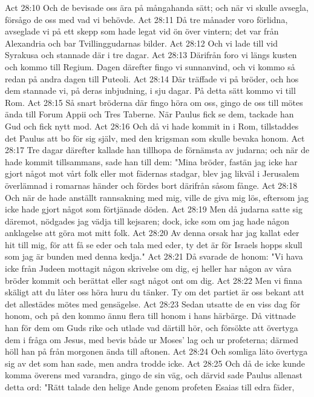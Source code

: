 Act 28:10  Och de bevisade oss ära på mångahanda sätt; och när vi skulle avsegla, försågo de oss med vad vi behövde.
Act 28:11  Då tre månader voro förlidna, avseglade vi på ett skepp som hade legat vid ön över vintern; det var från Alexandria och bar Tvillinggudarnas bilder.
Act 28:12  Och vi lade till vid Syrakusa och stannade där i tre dagar.
Act 28:13  Därifrån foro vi längs kusten och kommo till Regium. Dagen därefter fingo vi sunnanvind, och vi kommo så redan på andra dagen till Puteoli.
Act 28:14  Där träffade vi på bröder, och hos dem stannade vi, på deras inbjudning, i sju dagar. På detta sätt kommo vi till Rom.
Act 28:15  Så snart bröderna där fingo höra om oss, gingo de oss till mötes ända till Forum Appii och Tres Taberne. När Paulus fick se dem, tackade han Gud och fick nytt mod.
Act 28:16  Och då vi hade kommit in i Rom, tillstaddes det Paulus att bo för sig själv, med den krigsman som skulle bevaka honom.
Act 28:17  Tre dagar därefter kallade han tillhopa de förnämsta av judarna; och när de hade kommit tillsammans, sade han till dem: "Mina bröder, fastän jag icke har gjort något mot vårt folk eller mot fädernas stadgar, blev jag likväl i Jerusalem överlämnad i romarnas händer och fördes bort därifrån såsom fånge.
Act 28:18  Och när de hade anställt rannsakning med mig, ville de giva mig lös, eftersom jag icke hade gjort något som förtjänade döden.
Act 28:19  Men då judarna satte sig däremot, nödgades jag vädja till kejsaren; dock, icke som om jag hade någon anklagelse att göra mot mitt folk.
Act 28:20  Av denna orsak har jag kallat eder hit till mig, för att få se eder och tala med eder, ty det är för Israels hopps skull som jag är bunden med denna kedja."
Act 28:21  Då svarade de honom: "Vi hava icke från Judeen mottagit någon skrivelse om dig, ej heller har någon av våra bröder kommit och berättat eller sagt något ont om dig.
Act 28:22  Men vi finna skäligt att du låter oss höra huru du tänker. Ty om det partiet är oss bekant att det allestädes mötes med gensägelse.
Act 28:23  Sedan utsatte de en viss dag för honom, och på den kommo ännu flera till honom i hans härbärge. Då vittnade han för dem om Guds rike och utlade vad därtill hör, och försökte att övertyga dem i fråga om Jesus, med bevis både ur Moses' lag och ur profeterna; därmed höll han på från morgonen ända till aftonen.
Act 28:24  Och somliga läto övertyga sig av det som han sade, men andra trodde icke.
Act 28:25  Och då de icke kunde komma överens med varandra, gingo de sin väg, och därvid sade Paulus allenast detta ord: "Rätt talade den helige Ande genom profeten Esaias till edra fäder,
